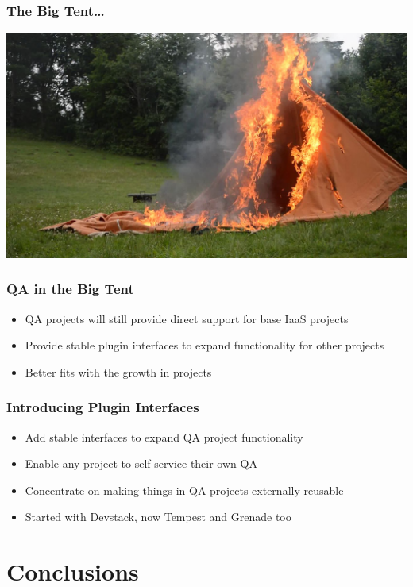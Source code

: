 \documentclass[aspectratio=43,11pt,hyperref={colorlinks=true}]{beamer}
\begin{document}
\begin{frame}
    \frametitle{The Big Tent\ldots}
    \begin{center}
        \includegraphics[width=.9\textwidth]{Burning_Tent.jpg}
    \end{center}
\end{frame}

\begin{frame}
    \frametitle{QA in the Big Tent}
    \begin{itemize}
        \item QA projects will still provide direct support for base IaaS projects
        \item Provide stable plugin interfaces to expand functionality for other projects
        \item Better fits with the growth in projects
    \end{itemize}
\end{frame}

\begin{frame}
    \frametitle{Introducing Plugin Interfaces}
    \begin{itemize}
        \item Add stable interfaces to expand QA project functionality
        \item Enable any project to self service their own QA
        \item Concentrate on making things in QA projects externally reusable
        \item Started with Devstack, now Tempest and Grenade too
    \end{itemize}
\end{frame}

\section{Conclusions}
\end{document}
